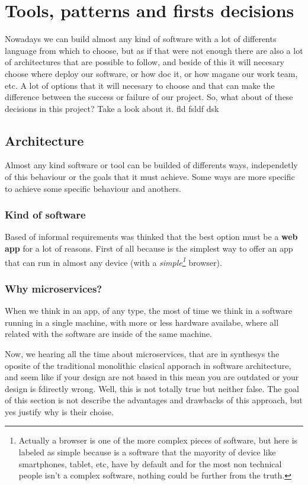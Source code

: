 \chapter{Tools, patterns and firsts decisions}

Nowadays we can build almost any kind of software with a lot of differents
language from which to choose, but as if that were not enough there
are also a lot of architectures that are possible to follow, and beside
of this it will necesary choose where deploy our software, or how
doc it, or how magane our work team, etc. A lot of options that it
will necesary to choose and that can make the difference between the
success or failure of our project. So, what about of these decisions
in this project? Take a look about it.
fld fsldf dsk

\section{Architecture}

Almost any kind software or tool can be builded of differents ways, independetly
of this behaviour or the goals that it must achieve. Some ways are more specific
to achieve some specific behaviour and anothers.

\subsection{Kind of software}
Based of informal requirements was thinked that the best option must be a \textbf{web app} for a lot of reasons. First of all because is the simplest way to offer an app that can run in almost any device (with a \textit{simple\footnote{Actually a browser is one of the more complex pieces of software, but here is labeled as simple because is a software that the mayority of device like smartphones, tablet, etc, have by default and for the most non technical people isn't a complex software, nothing could be further from the truth.}} browser).

\subsection{Why microservices?}

When we think in an app, of any type, the most of time we think in a software
running in a single machine, with more or less hardware availabe, where all
related with the software are inside of the same machine.

Now, we hearing all the time about microservices, that are in synthesys the
oposite of the traditional monolithic clasical apporach in software architecture,
and seem like if your design are not based in this mean you are outdated or your
design is fdirectly wrong.
Well, this is not totally true but neither false. The goal of this section is
not describe the advantages and drawbacks of this approach, but yes justify why
is their choise.

